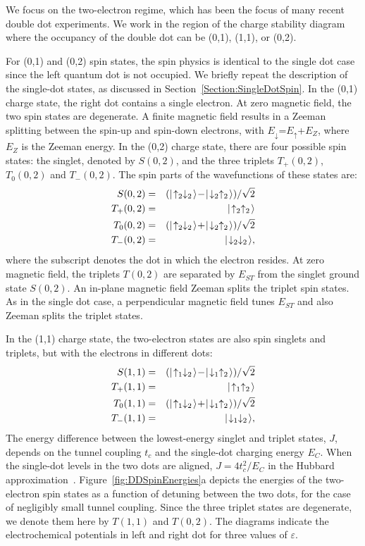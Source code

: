 \documentclass[rmp,twocolumn,aps]{revtex4}
\begin{document}
We focus on the two-electron regime, which has been the focus of
many recent double dot experiments. We work in the region of the
charge stability diagram where the occupancy of the double dot can
be (0,1), (1,1), or (0,2).

For (0,1) and (0,2) spin states, the spin physics is identical to
the single dot case since the left quantum dot is not occupied. We
briefly repeat the description of the single-dot states, as
discussed in Section~\ref{Section:SingleDotSpin}. In the (0,1)
charge state, the right dot contains a single electron. At zero
magnetic field, the two spin states are degenerate. A finite
magnetic field results in a Zeeman splitting between the spin-up
and spin-down electrons, with
$E_{\downarrow}$=$E_{\uparrow}$+$E_Z$, where $E_Z$ is the Zeeman
energy. In the (0,2) charge state, there are four possible spin
states: the singlet, denoted by $S(0,2)$, and the three triplets
$T_+(0,2)$, $T_0(0,2)$ and $T_-(0,2)$. The spin parts of the
wavefunctions of these states are:
\begin{eqnarray}
    S(0,2)&=&(\ket{\ua_2\da_2}\!-\!\ket{\da_2\ua_2})/\sqrt{2} \\
    T_+(0,2)&=&\ket{\ua_2\ua_2} \\
    T_0(0,2)&=&(\ket{\ua_2\da_2}\!+\!\ket{\da_2\ua_2})/\sqrt{2} \\
    T_-(0,2)&=&\ket{\da_2\da_2},
\end{eqnarray}
where the subscript denotes the dot in which the electron resides.
At zero magnetic field, the triplets $T(0,2)$ are separated by
$E_{ST}$ from the singlet ground state $S(0,2)$. An in-plane magnetic field
Zeeman splits the triplet spin states. As in the single dot case,
a perpendicular magnetic field tunes $E_{ST}$ and also Zeeman
splits the triplet states.

In the (1,1) charge state, the two-electron states are also spin
singlets and triplets, but with the electrons in different dots:
\begin{eqnarray}
    S(1,1)&=&(\ket{\ua_1\da_2}\!-\!\ket{\da_1\ua_2})/\sqrt{2} \\
    T_+(1,1)&=&\ket{\ua_1\ua_2} \\
    T_0(1,1)&=&(\ket{\ua_1\da_2}\!+\!\ket{\da_1\ua_2})/\sqrt{2} \\
    T_-(1,1)&=&\ket{\da_1\da_2},
\end{eqnarray}
The energy difference between the lowest-energy singlet
and triplet states, $J$, depends on the tunnel coupling $t_c$ and
the single-dot charging energy $E_C$. When the single-dot levels
in the two dots are aligned,  $J=4t_c^2/E_C$ in the Hubbard
approximation~\cite{BurkardPRB1999,BurkardThesis}.
Figure~\ref{fig:DDSpinEnergies}a depicts the energies of the
two-electron spin states as a function of detuning between the two
dots, for the case of negligibly small tunnel coupling. Since the
three triplet states are degenerate, we denote them here by
$T(1,1)$ and $T(0,2)$. The diagrams indicate the electrochemical potentials in left and right dot for three values of $\varepsilon$.
\end{document}
